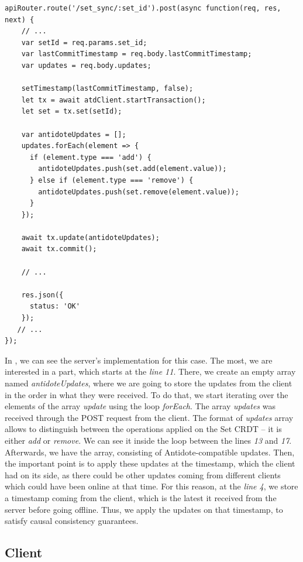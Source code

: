 \begin{lstlisting}[caption={Code for applying an \textit{add} operation to a Set CRDT.}, label={lst:dev3}]
apiRouter.route('/set_sync/:set_id').post(async function(req, res, next) {
    // ...
    var setId = req.params.set_id;
    var lastCommitTimestamp = req.body.lastCommitTimestamp;
    var updates = req.body.updates;

    setTimestamp(lastCommitTimestamp, false);
    let tx = await atdClient.startTransaction();
    let set = tx.set(setId);

    var antidoteUpdates = [];
    updates.forEach(element => {
      if (element.type === 'add') {
        antidoteUpdates.push(set.add(element.value));
      } else if (element.type === 'remove') {
        antidoteUpdates.push(set.remove(element.value));
      }
    });

    await tx.update(antidoteUpdates);
    await tx.commit();
    
    // ...

    res.json({
      status: 'OK'
    });
   // ...
});
\end{lstlisting}

In , we can see the server's implementation for this case. The most, we are interested in a part, which starts at the \textit{line 11}. There, we create an empty array named \textit{antidoteUpdates}, where we are going to store the updates from the client in the order in what they were received. To do that, we start iterating over the elements of the array \textit{update} using the loop \textit{forEach}. The array \textit{updates} was received through the POST request from the client. The format of \textit{updates} array allows to distinguish between the operations applied on the Set CRDT -- it is either \textit{add} or \textit{remove}. We can see it inside the loop between the lines \textit{13} and \textit{17}. Afterwards, we have the array, consisting of Antidote-compatible updates. Then, the important point is to apply these updates at the timestamp, which the client had on its side, as there could be other updates coming from different clients which could have been online at that time. For this reason, at the \textit{line 4}, we store a timestamp coming from the client, which is the latest it received from the server before going offline. Thus, we apply the updates on that timestamp, to satisfy causal consistency guarantees.

\subsection{Client}
\label{impl-client}

